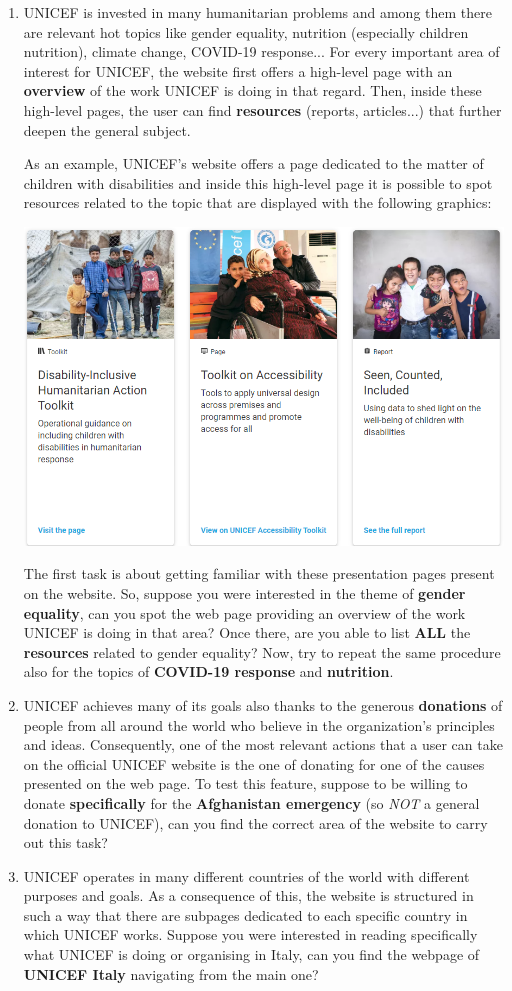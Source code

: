 \documentclass[11pt]{article}
\begin{document}
\begin{Form}
\begin{enumerate}
		\item UNICEF is invested in many humanitarian problems and among them there are relevant hot topics like gender equality, nutrition (especially children nutrition), climate change, COVID-19 response... For every important area of interest for UNICEF, the website first offers a high-level page with an \textbf{overview} of the work UNICEF is doing in that regard. Then, inside these high-level pages, the user can find \textbf{resources} (reports, articles...) that further deepen the general subject.\clearpage
	
		As an example, UNICEF's website offers a page dedicated to the matter of children with disabilities and inside this high-level page it is possible to spot resources related to the topic that are displayed with the following graphics:
		\begin{center}
			\includegraphics[width=0.3\linewidth]{res/Resources}
		\end{center}
		
		The first task is about getting familiar with these presentation pages present on the website. So, suppose you were interested in the theme of \textbf{gender equality}, can you spot the web page providing an overview of the work UNICEF is doing in that area? Once there, are you able to list \textbf{ALL} the \textbf{resources} related to gender equality?
		Now, try to repeat the same procedure also for the topics of \textbf{COVID-19 response} and \textbf{nutrition}.
		
		\item UNICEF achieves many of its goals also thanks to the generous \textbf{donations} of people from all around the world who believe in the organization's principles and ideas. Consequently, one of the most relevant actions that a user can take on the official UNICEF website is the one of donating for one of the causes presented on the web page. To test this feature, suppose to be willing to donate \textbf{specifically} for the \textbf{Afghanistan emergency} (so \textit{NOT} a general donation to UNICEF), can you find the correct area of the website to carry out this task?
		
		\item UNICEF operates in many different countries of the world with different purposes and goals. As a consequence of this, the website is structured in such a way that there are subpages dedicated to each specific country in which UNICEF works. Suppose you were interested in reading specifically what UNICEF is doing or organising in Italy, can you find the webpage of \textbf{UNICEF Italy} navigating from the main one?
		

\end{enumerate}
\end{Form}
\end{document}
